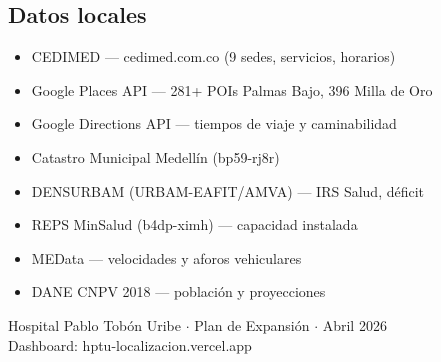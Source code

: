 \documentclass[11pt, a4paper]{article}
\begin{document}
\subsection{Datos locales}
\begin{itemize}[leftmargin=1cm]\small
  \item CEDIMED — cedimed.com.co (9 sedes, servicios, horarios)
  \item Google Places API — 281+ POIs Palmas Bajo, 396 Milla de Oro
  \item Google Directions API — tiempos de viaje y caminabilidad
  \item Catastro Municipal Medell\'{i}n (bp59-rj8r)
  \item DENSURBAM (URBAM-EAFIT/AMVA) — IRS Salud, d\'{e}ficit
  \item REPS MinSalud (b4dp-ximh) — capacidad instalada
  \item MEData — velocidades y aforos vehiculares
  \item DANE CNPV 2018 — poblaci\'{o}n y proyecciones
\end{itemize}

\vfill
\begin{center}

\vspace{6pt}
{\small\textcolor{slate}{Hospital Pablo Tob\'{o}n Uribe $\cdot$ Plan de Expansi\'{o}n $\cdot$ Abril 2026}}\\
{\small\textcolor{slate}{Dashboard: hptu-localizacion.vercel.app}}
\end{center}
\end{document}
